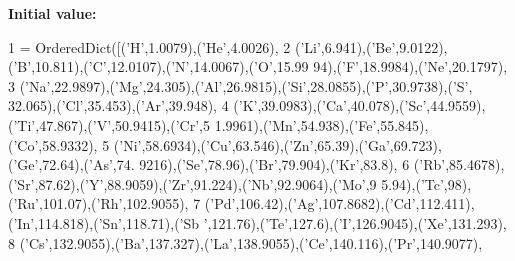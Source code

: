{\bfseries Initial value\+:}
\begin{DoxyCode}
1 =  OrderedDict([(\textcolor{stringliteral}{'H'},1.0079),(\textcolor{stringliteral}{'He'},4.0026),
2                              (\textcolor{stringliteral}{'Li'},6.941),(\textcolor{stringliteral}{'Be'},9.0122),(\textcolor{stringliteral}{'B'},10.811),(\textcolor{stringliteral}{'C'},12.0107),(\textcolor{stringliteral}{'N'},14.0067),(\textcolor{stringliteral}{'O'},15.99
      94),(\textcolor{stringliteral}{'F'},18.9984),(\textcolor{stringliteral}{'Ne'},20.1797),
3                              (\textcolor{stringliteral}{'Na'},22.9897),(\textcolor{stringliteral}{'Mg'},24.305),(\textcolor{stringliteral}{'Al'},26.9815),(\textcolor{stringliteral}{'Si'},28.0855),(\textcolor{stringliteral}{'P'},30.9738),(\textcolor{stringliteral}{'S'},
      32.065),(\textcolor{stringliteral}{'Cl'},35.453),(\textcolor{stringliteral}{'Ar'},39.948),
4                              (\textcolor{stringliteral}{'K'},39.0983),(\textcolor{stringliteral}{'Ca'},40.078),(\textcolor{stringliteral}{'Sc'},44.9559),(\textcolor{stringliteral}{'Ti'},47.867),(\textcolor{stringliteral}{'V'},50.9415),(\textcolor{stringliteral}{'Cr'},5
      1.9961),(\textcolor{stringliteral}{'Mn'},54.938),(\textcolor{stringliteral}{'Fe'},55.845),(\textcolor{stringliteral}{'Co'},58.9332),
5                              (\textcolor{stringliteral}{'Ni'},58.6934),(\textcolor{stringliteral}{'Cu'},63.546),(\textcolor{stringliteral}{'Zn'},65.39),(\textcolor{stringliteral}{'Ga'},69.723),(\textcolor{stringliteral}{'Ge'},72.64),(\textcolor{stringliteral}{'As'},74.
      9216),(\textcolor{stringliteral}{'Se'},78.96),(\textcolor{stringliteral}{'Br'},79.904),(\textcolor{stringliteral}{'Kr'},83.8),
6                              (\textcolor{stringliteral}{'Rb'},85.4678),(\textcolor{stringliteral}{'Sr'},87.62),(\textcolor{stringliteral}{'Y'},88.9059),(\textcolor{stringliteral}{'Zr'},91.224),(\textcolor{stringliteral}{'Nb'},92.9064),(\textcolor{stringliteral}{'Mo'},9
      5.94),(\textcolor{stringliteral}{'Tc'},98),(\textcolor{stringliteral}{'Ru'},101.07),(\textcolor{stringliteral}{'Rh'},102.9055),
7                              (\textcolor{stringliteral}{'Pd'},106.42),(\textcolor{stringliteral}{'Ag'},107.8682),(\textcolor{stringliteral}{'Cd'},112.411),(\textcolor{stringliteral}{'In'},114.818),(\textcolor{stringliteral}{'Sn'},118.71),(\textcolor{stringliteral}{'Sb
      '},121.76),(\textcolor{stringliteral}{'Te'},127.6),(\textcolor{stringliteral}{'I'},126.9045),(\textcolor{stringliteral}{'Xe'},131.293),
8                              (\textcolor{stringliteral}{'Cs'},132.9055),(\textcolor{stringliteral}{'Ba'},137.327),(\textcolor{stringliteral}{'La'},138.9055),(\textcolor{stringliteral}{'Ce'},140.116),(\textcolor{stringliteral}{'Pr'},140.9077),

\end{DoxyCode}
